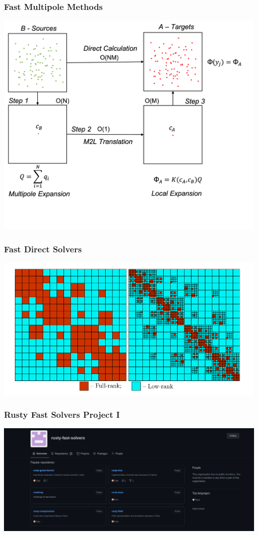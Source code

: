 \begin{frame}
    \frametitle{Fast Multipole Methods}
    \includegraphics[width=\linewidth]{assets/three_step.png}
\end{frame}


\begin{frame}
    \frametitle{Fast Direct Solvers}
    \includegraphics[width=\linewidth]{assets/ifmm.png}

\end{frame}

\begin{frame}
    \frametitle{Rusty Fast Solvers Project I}
    \includegraphics[width=0.95\linewidth]{assets/rfs.png}
\end{frame}

